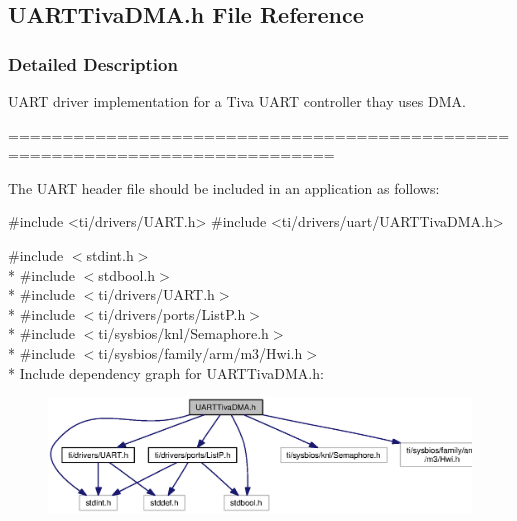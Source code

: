 \subsection{U\+A\+R\+T\+Tiva\+D\+M\+A.\+h File Reference}
\label{_u_a_r_t_tiva_d_m_a_8h}


\subsubsection{Detailed Description}
U\+A\+R\+T driver implementation for a Tiva U\+A\+R\+T controller thay uses D\+M\+A. 

============================================================================

The U\+A\+R\+T header file should be included in an application as follows\+: 
\begin{DoxyCode}
\textcolor{preprocessor}{#include <ti/drivers/UART.h>}
\textcolor{preprocessor}{#include <ti/drivers/uart/UARTTivaDMA.h>}
\end{DoxyCode}
 

{\ttfamily \#include $<$stdint.\+h$>$}\\*
{\ttfamily \#include $<$stdbool.\+h$>$}\\*
{\ttfamily \#include $<$ti/drivers/\+U\+A\+R\+T.\+h$>$}\\*
{\ttfamily \#include $<$ti/drivers/ports/\+List\+P.\+h$>$}\\*
{\ttfamily \#include $<$ti/sysbios/knl/\+Semaphore.\+h$>$}\\*
{\ttfamily \#include $<$ti/sysbios/family/arm/m3/\+Hwi.\+h$>$}\\*
Include dependency graph for U\+A\+R\+T\+Tiva\+D\+M\+A.\+h\+:
\nopagebreak
\begin{figure}[H]
\begin{center}
\leavevmode
\includegraphics[width=350pt]{_u_a_r_t_tiva_d_m_a_8h__incl}
\end{center}
\end{figure}
